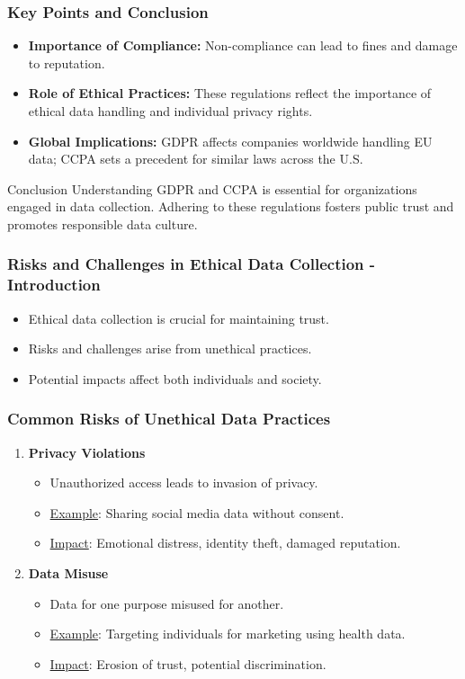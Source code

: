 \documentclass{beamer}
\begin{document}
\begin{frame}[fragile]
    \frametitle{Key Points and Conclusion}
    \begin{itemize}
        \item \textbf{Importance of Compliance:} Non-compliance can lead to fines and damage to reputation.
        \item \textbf{Role of Ethical Practices:} These regulations reflect the importance of ethical data handling and individual privacy rights.
        \item \textbf{Global Implications:} GDPR affects companies worldwide handling EU data; CCPA sets a precedent for similar laws across the U.S.
    \end{itemize}
    
    \begin{block}{Conclusion}
        Understanding GDPR and CCPA is essential for organizations engaged in data collection. Adhering to these regulations fosters public trust and promotes responsible data culture.
    \end{block}
\end{frame}

\begin{frame}[fragile]
    \frametitle{Risks and Challenges in Ethical Data Collection - Introduction}
    \begin{itemize}
        \item Ethical data collection is crucial for maintaining trust.
        \item Risks and challenges arise from unethical practices.
        \item Potential impacts affect both individuals and society.
    \end{itemize}
\end{frame}

\begin{frame}[fragile]
    \frametitle{Common Risks of Unethical Data Practices}
    \begin{enumerate}
        \item \textbf{Privacy Violations}
            \begin{itemize}
                \item Unauthorized access leads to invasion of privacy.
                \item \underline{Example}: Sharing social media data without consent.
                \item \underline{Impact}: Emotional distress, identity theft, damaged reputation.
            \end{itemize}
        \item \textbf{Data Misuse}
            \begin{itemize}
                \item Data for one purpose misused for another.
                \item \underline{Example}: Targeting individuals for marketing using health data.
                \item \underline{Impact}: Erosion of trust, potential discrimination.
            \end{itemize}
    \end{enumerate}
\end{frame}
\end{document}
